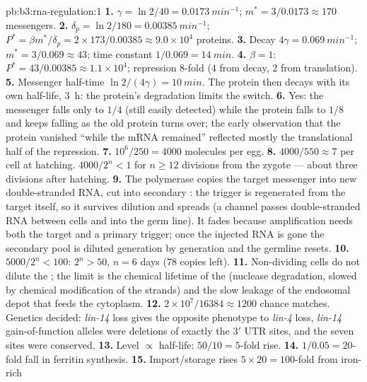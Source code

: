 \begin{solution}{pb:b3:rna-regulation:1}
\textbf{1.} $\gamma = \ln 2/40 = \qty{0.0173}{min^{-1}}$; $m^{*} =
3/0.0173 \approx 170$ messengers.
\textbf{2.} $\delta_{p} = \ln 2/180 = \qty{0.00385}{min^{-1}}$; $P^{*} =
\beta m^{*}/\delta_{p} = 2\times 173/0.00385 \approx 9.0\times 10^{4}$
proteins.
\textbf{3.} Decay $4\gamma = \qty{0.069}{min^{-1}}$; $m^{*} = 3/0.069
\approx 43$; time constant $1/0.069 = \qty{14}{min}$.
\textbf{4.} $\beta = 1$: $P^{*} = 43/0.00385 \approx 1.1\times 10^{4}$;
repression $8$-fold ($4$ from decay, $2$ from translation).
\textbf{5.} Messenger half-time $\ln 2/(4\gamma) = \qty{10}{min}$. The
protein then decays with its own half-life, \qty{3}{h}: the protein's
degradation limits the switch.
\textbf{6.} Yes: the messenger falls only to $1/4$ (still easily
detected) while the protein falls to $1/8$ and keeps falling as the
old protein turns over; the early observation that the protein
vanished ``while the mRNA remained'' reflected mostly the translational
half of the repression.
\textbf{7.} $10^{6}/250 = 4000$ molecules per egg.
\textbf{8.} $4000/550 \approx 7$ per cell at hatching. $4000/2^{n} < 1$
for $n \ge 12$ divisions from the zygote --- about three divisions
after hatching.
\textbf{9.} The polymerase copies the target messenger into new
double-stranded RNA, cut into secondary : the trigger is
regenerated from the target itself, so it survives dilution and spreads
(a channel passes double-stranded RNA between cells and into the germ
line). It fades because amplification needs both the target and a
primary trigger; once the injected RNA is gone the secondary pool is
diluted generation by generation and the germline resets.
\textbf{10.} $5000/2^{n} < 100$: $2^{n} > 50$, $n = 6$ days ($78$
copies left).
\textbf{11.} Non-dividing cells do not dilute the ; the limit is the
chemical lifetime of the  (nuclease degradation, slowed by
chemical modification of the strands) and the slow leakage of the
endosomal depot that feeds the cytoplasm.
\textbf{12.} $2\times 10^{7}/\num{16384} \approx \num{1200}$ chance
matches. Genetics decided: \emph{lin-14} loss gives the opposite
phenotype to \emph{lin-4} loss, \emph{lin-14} gain-of-function alleles
were deletions of exactly the 3$'$ UTR sites, and the seven sites were
conserved.
\textbf{13.} Level $\propto$ half-life: $50/10 = 5$-fold rise.
\textbf{14.} $1/0.05 = 20$-fold fall in ferritin synthesis.
\textbf{15.} Import/storage rises $5\times 20 = 100$-fold from iron-rich

\end{solution}
